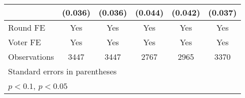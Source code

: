 \begin{table}[htbp]
\begin{tabular}{l*{5}{c}}
                    &     (0.036)       &     (0.036)       &     (0.044)       &     (0.042)       &     (0.037)       \\
[1em]
\hline  Round FE    &         Yes       &         Yes       &         Yes       &         Yes       &         Yes       \\
[1em]
Voter FE            &         Yes       &         Yes       &         Yes       &         Yes       &         Yes       \\
\hline
Observations        &        3447       &        3447       &        2767       &        2965       &        3370       \\
\hline\hline
\multicolumn{6}{l}{\footnotesize Standard errors in parentheses}\\
\multicolumn{6}{l}{\footnotesize \sym{+} \(p<0.1\), \sym{*} \(p<0.05\)}\\
\end{tabular}
\end{table}
